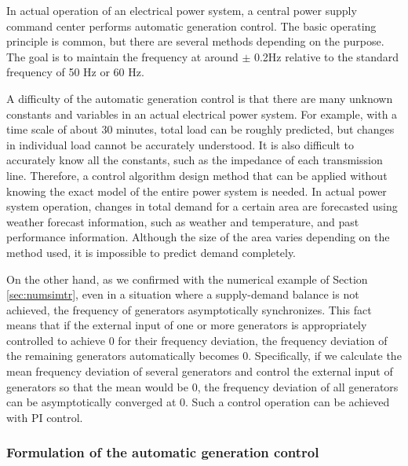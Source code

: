 \documentclass[graybox, envcountchap]{svmult}
\begin{document}
In actual operation of an electrical power system, a central power supply command center performs automatic generation control.
The basic operating principle is common, but there are several methods depending on the purpose.
The goal is to maintain the frequency at around $\pm$ 0.2Hz relative to the standard frequency of 50 Hz or 60 Hz.


A difficulty of the automatic generation control is that there are many unknown constants and variables in an actual electrical power system.
For example, with a time scale of about 30 minutes, total load can be roughly predicted, but changes in individual load cannot be accurately understood.
It is also difficult to accurately know all the constants, such as the impedance of each transmission line.
Therefore, a control algorithm design method that can be applied without knowing the exact model of the entire power system is needed.
In actual power system operation, changes in total demand for a certain area are forecasted using weather forecast information, such as weather and temperature, and past performance information.
Although the size of the area varies depending on the method used, it is impossible to predict demand completely.


On the other hand, as we confirmed with the numerical example of Section \ref{sec:numsimtr}, even in a situation where a supply-demand balance is not achieved, the frequency of generators asymptotically synchronizes.
This fact means that if the external input of one or more generators is appropriately controlled to achieve 0 for their frequency deviation, the frequency deviation of the remaining generators automatically becomes 0.
Specifically, if we calculate the mean frequency deviation of several generators and control the external input of generators so that the mean would be 0, the frequency deviation of all generators can be asymptotically converged at 0.
Such a control operation can be achieved with PI control.


\smallskip
\subsubsection{Formulation of the automatic generation control}
\end{document}
